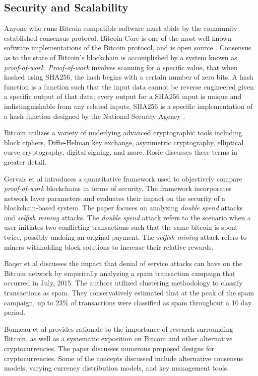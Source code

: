 \documentclass[12pt]{report}
\begin{document}
\subsection{Security and Scalability}
Anyone who runs Bitcoin compatible software must abide by the community established consensus protocol. Bitcoin Core is one of the most well known software implementations of the Bitcoin protocol, and is open source \cite{BitcoinCore.}. Consensus as to the state of Bitcoin's blockchain is accomplished by a system known as \textit{proof-of-work}. \textit{Proof-of-work} involves scanning for a specific value, that when hashed using SHA256, the hash begins with a certain number of zero bits. A hash function is a function such that the input data cannot be reverse engineered given a specific output of that data; every output for a SHA256 input is unique and indistinguishable from any related inputs. SHA256 is a specific implementation of a hash function designed by the National Security Agency \cite{.2016b}.

Bitcoin utilizes a variety of underlying advanced cryptographic tools including block ciphers, Diffie-Helman key exchange, asymmetric cryptography, elliptical curve cryptography, digital signing, and more. Rosic \cite{Rosic.2017} discusses these terms in greater detail.

Gervais et al \cite{Gervais.2016} introduces a quantitative framework used to objectively compare \textit{proof-of-work} blockchains in terms of security. The framework incorporates network layer parameters and evaluates their impact on the security of a blockchain-based system. The paper focuses on analyzing \textit{double spend} attacks and \textit{selfish mining} attacks. The \textit{double spend} attack refers to the scenario when a user initiates two conflicting transactions such that the same bitcoin is spent twice, possibly undoing an original payment. The \textit{selfish mining} attack refers to miners withholding block solutions to increase their relative rewards.

Baqer et al \cite{Baqer.2016} discusses the impact that denial of service attacks can have on the Bitcoin network by empirically analyzing a spam transaction campaign that occurred in July, 2015. The authors utilized clustering methodology to classify transactions as spam. They conservatively estimated that at the peak of the spam campaign, up to 23\% of transactions were classified as spam throughout a 10 day period.  

Bonneau et al \cite{Bonneau.2015} provides rationale to the importance of research surrounding Bitcoin, as well as a systematic exposition on Bitcoin and other alternative cryptocurrencies. The paper discusses numerous proposed designs for cryptocurrencies. Some of the concepts discussed include alternative consensus models, varying currency distribution models, and key management tools.
\end{document}
